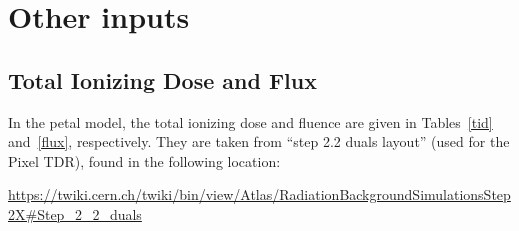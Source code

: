 
\section{Other inputs}

\subsection{Total Ionizing Dose and Flux}

In the petal model, the total ionizing dose and fluence are given in Tables~\ref{tid} and~\ref{flux},
respectively. They are taken from ``step 2.2 duals layout'' (used for the Pixel TDR), found in the following location:

{\small
\url{https://twiki.cern.ch/twiki/bin/view/Atlas/RadiationBackgroundSimulationsStep2X#Step_2_2_duals}
}

\begin{table}[ht]
\begin{centering} %
\caption{TID in 3000 fb$^{-1}$ of collected data [Rad].
The model uses 4000 fb$^{-1}$ integrated luminosity nominally and 6000 fb$^{-1}$ as a safety factor.}
\label{tid}
\end{centering}
\end{table}


